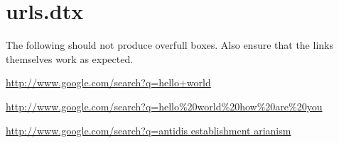 \documentclass{article}
\begin{document}
\begingroup

    \let\@this@opt\relax

    \def\@this@page{{}{\hi@fn@sig{infra}}{Section III}}
    \def\@this@page{{discussion}{\hi@fn@sig{supra}}{notes 2--3}}

\endgroup

\begingroup

    \def\@this@opt{remarks}
    \def\@this@page{{}{\hi@fn@sig{infra}}{Section III}}
    \def\@this@page{{discussion}{\hi@fn@sig{supra}}{notes 2--3}}

\endgroup

\begingroup

    \let\@this@opt\relax
    \@hi@inlinetrue
    \def\@this@page{{}{\hi@fn@sig{infra}}{Section III}}
    \def\@this@page{{discussion}{\hi@fn@sig{supra}}{notes 2--3}}

\endgroup


\section{urls.dtx}

\begingroup

The following should not produce overfull boxes. Also ensure that the links
themselves work as expected.

\immediate{}

\def\testbox#1{%
    \vrule\vbox{%
        \hsize 1in \relax
        \url{#1}%
    }\vrule\quad
}

\testbox{http://www.google.com/search?q=hello+world}
\testbox{http://www.google.com/search?q=hello\%20world\%20how\%20are\%20you}
\testbox{http://www.google.com/search?q=antidis establishment arianism}

\immediate{}

\endgroup

\end{document}
